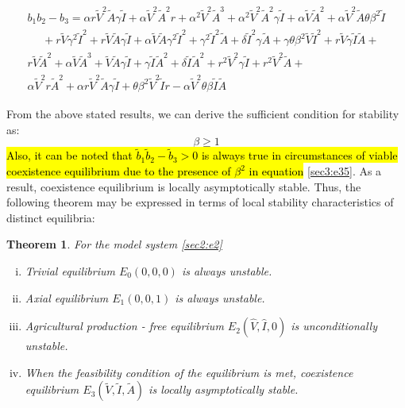 \documentclass[12pt]{article}
\newtheorem{theorem}{Theorem}[section]
\numberwithin{equation}{section}
\begin{document}
\begin{enumerate}[i).]
\begin{equation}\label{sec3:e35}
\begin{split}
b_1b_2-b_3=\alpha r \tilde V^2 \tilde A \gamma \tilde I + \alpha \tilde V^2 \tilde A^2 r + \alpha^2 \tilde V^2 \tilde A^3 + \alpha^2\tilde V^2\tilde A^2\gamma \tilde I + \alpha \tilde V \tilde A^2 + \alpha \tilde V^2 \tilde A \theta \beta^2\tilde I \\
~~~~~~+ r\tilde V \gamma^2\tilde I^2 + r\tilde V\tilde A\gamma\tilde I+ \alpha \tilde V\tilde A\gamma^2\tilde I^2 + \gamma^2\tilde I^2\tilde A+\delta  \tilde I^2\gamma \tilde A
+\gamma \theta \beta^2 \tilde V \tilde I^2+ r\tilde V\gamma\tilde I \tilde A +\\
r\tilde V \tilde A^2 + \alpha \tilde V\tilde A^3+\tilde V\tilde A\gamma \tilde I+\gamma \tilde I \tilde A^2 +\delta \tilde I \tilde A^2 +r^2\tilde V^2\gamma\tilde I+r^2\tilde V^2\tilde A+\\
\alpha \tilde V^2 r \tilde A^2 + \alpha r \tilde V^2 \tilde A \gamma \tilde I+ \theta \beta^2 \tilde V^2 \tilde I r -\alpha\tilde V^2 \theta \beta \tilde I \tilde A
\end{split}
\end{equation}
\end{enumerate}
From the above stated results, we can derive the sufficient condition for stability as:
\begin{equation}\label{sec3:e36}
\beta \geq 1
\end{equation} 
\hl{Also, it can be noted that $\tilde b_1\tilde b_2-\tilde b_3>0$ is always true in circumstances of viable coexistence equilibrium due to the presence of $\beta^2$ in equation} \eqref{sec3:e35}. As a result, coexistence equilibrium is locally asymptotically stable.
Thus, the following theorem may be expressed in terms of local stability characteristics of distinct equilibria:
\begin{theorem}\label{Theorem 3.4}
For the model system \eqref{sec2:e2}
\begin{enumerate}[i)]
\item Trivial equilibrium $E_0(0,0,0)$ is always unstable.
\item Axial equilibrium $E_1(0,0,1)$ is always unstable.
\item Agricultural production - free equilibrium $E_2(\hat V,\hat I,0)$ is unconditionally unstable.
\item When the feasibility condition of the equilibrium is met, coexistence equilibrium $E_3(\tilde V,\tilde I,\tilde A)$ is locally asymptotically stable.
\end{enumerate}
 \end{theorem}
\end{document}
